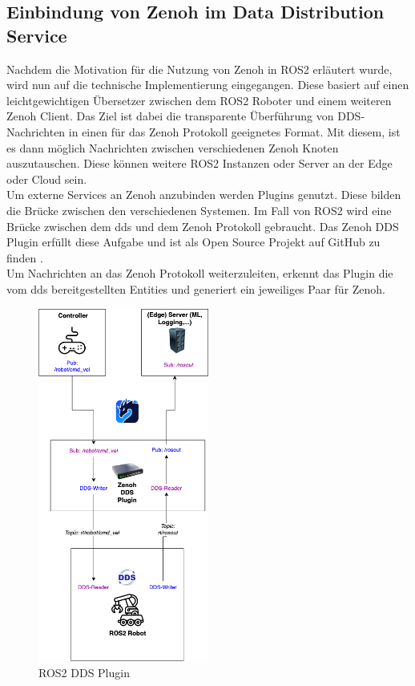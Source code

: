 \subsection{Einbindung von Zenoh im Data Distribution Service} %
\label{sub:Einbindung von Zenoh im Data Distribution Service}

Nachdem die Motivation für die Nutzung von Zenoh in ROS2 erläutert wurde, wird nun auf die technische Implementierung eingegangen. Diese basiert auf einen leichtgewichtigen Übersetzer zwischen dem ROS2 Roboter und einem weiteren Zenoh Client. Das Ziel ist dabei die transparente Überführung von DDS-Nachrichten in einen für das Zenoh Protokoll geeignetes Format. Mit diesem, ist es dann möglich Nachrichten zwischen verschiedenen Zenoh Knoten auszutauschen. Diese können weitere ROS2 Instanzen oder Server an der Edge oder Cloud sein.\\

Um externe Services an Zenoh anzubinden werden Plugins genutzt. Diese bilden die Brücke zwischen den verschiedenen Systemen. Im Fall von ROS2 wird eine Brücke zwischen dem \acrlong{dds} und dem Zenoh Protokoll gebraucht. Das Zenoh DDS Plugin erfüllt diese Aufgabe und ist als Open Source Projekt auf GitHub zu finden \cite{Eclipsezenoh}.\\
Um Nachrichten an das Zenoh Protokoll weiterzuleiten, erkennt das Plugin die vom \acrlong{dds} bereitgestellten Entities und generiert ein jeweiliges Paar für Zenoh.

\begin{figure}
  \begin{center}
    \includegraphics[width=0.5\textwidth]{figures/ros2-dds.drawio.png}
  \end{center}
  \caption{ROS2 DDS Plugin}
  \label{fig:ros2-dds}
\end{figure}

